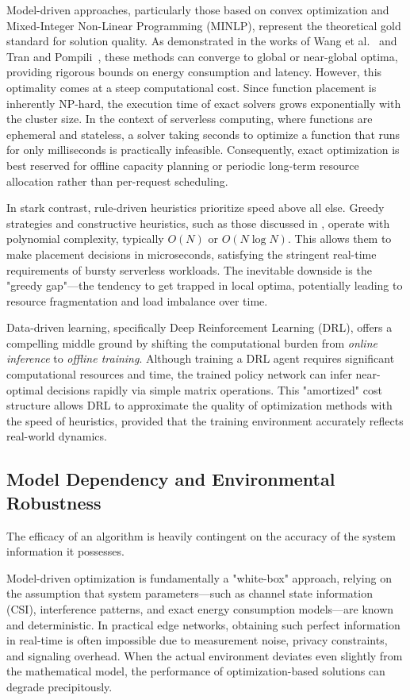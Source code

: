 \documentclass[lettersize,journal]{IEEEtran}
\begin{document}
Model-driven approaches, particularly those based on convex optimization and Mixed-Integer Non-Linear Programming (MINLP), represent the theoretical gold standard for solution quality. As demonstrated in the works of Wang et al.~\cite{wang2021Lagrangian} and Tran and Pompili~\cite{tran2018MINLP}, these methods can converge to global or near-global optima, providing rigorous bounds on energy consumption and latency. However, this optimality comes at a steep computational cost. Since function placement is inherently NP-hard, the execution time of exact solvers grows exponentially with the cluster size. In the context of serverless computing, where functions are ephemeral and stateless, a solver taking seconds to optimize a function that runs for only milliseconds is practically infeasible. Consequently, exact optimization is best reserved for offline capacity planning or periodic long-term resource allocation rather than per-request scheduling.

In stark contrast, rule-driven heuristics prioritize speed above all else. Greedy strategies and constructive heuristics, such as those discussed in \cite{saha2019SDF}, operate with polynomial complexity, typically $O(N)$ or $O(N \log N)$. This allows them to make placement decisions in microseconds, satisfying the stringent real-time requirements of bursty serverless workloads. The inevitable downside is the "greedy gap"—the tendency to get trapped in local optima, potentially leading to resource fragmentation and load imbalance over time.

Data-driven learning, specifically Deep Reinforcement Learning (DRL), offers a compelling middle ground by shifting the computational burden from \textit{online inference} to \textit{offline training}. Although training a DRL agent requires significant computational resources and time, the trained policy network can infer near-optimal decisions rapidly via simple matrix operations. This "amortized" cost structure allows DRL to approximate the quality of optimization methods with the speed of heuristics, provided that the training environment accurately reflects real-world dynamics.

\subsection{Model Dependency and Environmental Robustness}
The efficacy of an algorithm is heavily contingent on the accuracy of the system information it possesses.

Model-driven optimization is fundamentally a "white-box" approach, relying on the assumption that system parameters—such as channel state information (CSI), interference patterns, and exact energy consumption models—are known and deterministic. In practical edge networks, obtaining such perfect information in real-time is often impossible due to measurement noise, privacy constraints, and signaling overhead. When the actual environment deviates even slightly from the mathematical model, the performance of optimization-based solutions can degrade precipitously.
\end{document}
